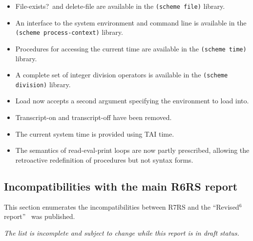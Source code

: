 \begin{itemize}
\item {\cf File-exists?}\ and {\cf delete-file} are available in the
{\tt (scheme file)} library.

\item An interface to the system environment and command line is
available in the {\tt (scheme process-context)} library.

\item Procedures for accessing the current time are available in the
{\tt (scheme time)} library.

\item A complete set of integer division operators is available in the
{\tt (scheme division)} library.

\item {\cf Load} now accepts a second argument specifying the environment to
load into.

\item {\cf Transcript-on} and {\cf transcript-off} have been removed.

\item The current system time is provided using TAI time.

\item The semantics of read-eval-print loops are now partly prescribed,
allowing the retroactive redefinition of procedures but not syntax forms.

\end{itemize}

\subsection*{Incompatibilities with the main R6RS report}
This section enumerates the incompatibilities between R7RS and
the ``Revised$^6$ report''~\cite{R6RS} was published.

{\em The list is incomplete and subject to change while this report is in draft status.}

